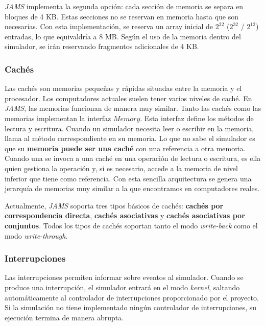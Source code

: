 \textit{JAMS} implementa la segunda opción:
cada sección de memoria se separa en bloques de 4 KB\@.
Estas secciones no se reservan en memoria
hasta que son necesarias.
Con esta implementación, se reserva un array inicial de
$2^{22}$ ($2^{32}$ / $2^{12}$) entradas, lo que equivaldría
a 8 MB\@.
Según el uso de la memoria dentro del simulador,
se irán reservando fragmentos adicionales de 4 KB\@.

\subsubsection{Cachés}\label{subsubsec:caches}

Las cachés son memorias pequeñas y rápidas situadas entre
la memoria y el procesador.
Los computadores actuales suelen tener varios niveles de caché.
En \textit{JAMS}, las memorias funcionan de manera muy similar.
Tanto las cachés como las memorias implementan la interfaz $Memory$.
Esta interfaz define los métodos de lectura y escritura.
Cuando un simulador necesita leer o escribir en la memoria,
llama al método correspondiente en su memoria.
Lo que no sabe el simulador es que su \textbf{memoria puede ser una caché}
con una referencia a otra memoria.
Cuando una se invoca a una caché en una operación de lectura o escritura,
es ella quien gestiona la operación y,
si es necesario, accede a la memoria de nivel inferior que tiene como referencia.
Con esta sencilla arquitectura se genera una jerarquía de memorias
muy similar a la que encontramos en computadores reales.

Actualmente, \textit{JAMS} soporta tres tipos básicos
de cachés: \textbf{cachés por correspondencia directa},
\textbf{cachés asociativas} y \textbf{cachés asociativas por conjuntos}.
Todos los tipos de cachés soportan tanto el modo \textit{write-back}
como el modo \textit{write-through}.

\subsubsection{Interrupciones}\label{subsubsec:interrupciones}

Las interrupciones permiten informar sobre eventos al
simulador.
Cuando se produce una interrupción, el simulador entrará en el
modo \textit{kernel}, saltando automáticamente al controlador
de interrupciones proporcionado por el proyecto.
Si la simulación no tiene implementado ningún controlador de
interrupciones, su ejecución termina de manera abrupta.

